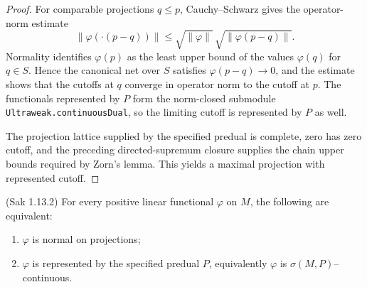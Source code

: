 \begin{proof}
  \leanok
  For comparable projections $q\le p$, Cauchy--Schwarz gives the operator-norm estimate
  \[
    \|\varphi(\mathord\cdot(p-q))\|
      \le \sqrt{\|\varphi\|}\,\sqrt{\|\varphi(p-q)\|}.
  \]
  Normality identifies $\varphi(p)$ as the least upper bound of the values $\varphi(q)$ for
  $q\in S$. Hence the canonical net over $S$ satisfies $\varphi(p-q)\to0$, and the estimate shows
  that the cutoffs at $q$ converge in operator norm to the cutoff at $p$. The functionals
  represented by $P$ form the norm-closed submodule
  \texttt{Ultraweak.continuousDual}, so the limiting cutoff is represented by $P$ as well.

  The projection lattice supplied by the specified predual is complete, zero has zero cutoff,
  and the preceding directed-supremum closure supplies the chain upper bounds required by Zorn's
  lemma. This yields a maximal projection with represented cutoff.
\end{proof}

\begin{theorem}
  \label{thm:sigma_cts_of_normal_Sak_1_13_2} (Sak 1.13.2)
  \leanok
  For every positive linear functional $\varphi$ on $M$, the following are equivalent:
  \begin{enumerate}
    \item $\varphi$ is normal on projections;
    \item $\varphi$ is represented by the specified predual $P$, equivalently
      $\varphi$ is $\sigma(M,P)$--continuous.
  \end{enumerate}
\end{theorem}

